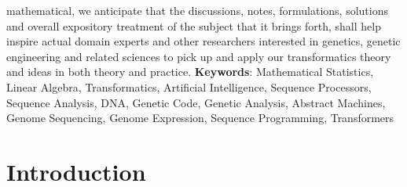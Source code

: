 \documentclass[a4paper, 18pt]{book} %
\begin{document}
mathematical, we anticipate that the discussions, notes, formulations, solutions and overall expository treatment of the subject that it brings forth, shall help inspire actual domain experts and other researchers interested in genetics, genetic engineering and related sciences to pick up and apply our transformatics theory and ideas in both theory and practice.
     \newline\newline
     \textbf{Keywords}: Mathematical Statistics, Linear Algebra, Transformatics, Artificial Intelligence, Sequence Processors, Sequence Analysis, DNA, Genetic Code, Genetic Analysis, Abstract Machines, Genome Sequencing, Genome Expression, Sequence Programming, Transformers

\newpage

\chapter{Introduction}
\label{SEC1}
\end{document}
